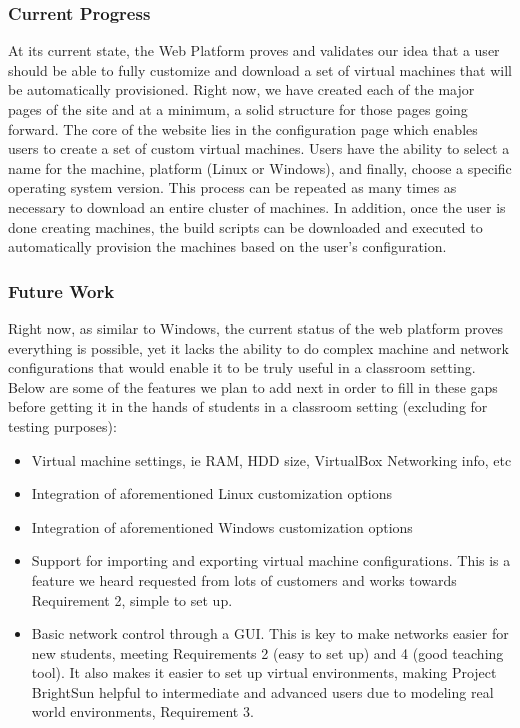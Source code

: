 \documentclass[openright]{report}
\begin{document}
\subsubsection{Current Progress}
At its current state, the Web Platform proves and validates our idea that a user should be able to fully customize and download a set of virtual machines that will be automatically provisioned. Right now, we have created each of the major pages of the site and at a minimum, a solid structure for those pages going forward. The core of the website lies in the configuration page which enables users to create a set of custom virtual machines. Users have the ability to select a name for the machine, platform (Linux or Windows), and finally, choose a specific operating system version. This process can be repeated as many times as necessary to download an entire cluster of machines. In addition, once the user is done creating machines, the build scripts can be downloaded and executed to automatically provision the machines based on the user's configuration.

\subsubsection{Future Work}
Right now, as similar to Windows, the current status of the web platform proves everything is possible, yet it lacks the ability to do complex machine and network configurations that would enable it to be truly useful in a classroom setting. Below are some of the features we plan to add next in order to fill in these gaps before getting it in the hands of students in a classroom setting (excluding for testing purposes):

\begin{itemize}
    \item Virtual machine settings, ie RAM, HDD size, VirtualBox Networking info, etc
    \item Integration of aforementioned Linux customization options
    \item Integration of aforementioned Windows customization options
    \item Support for importing and exporting virtual machine configurations. This is a feature we heard requested from lots of customers and works towards Requirement 2, simple to set up.
    \item Basic network control through a GUI. This is key to make networks easier for new students, meeting Requirements 2 (easy to set up) and 4 (good teaching tool). It also makes it easier to set up virtual environments, making Project BrightSun helpful to intermediate and advanced users due to modeling real world environments, Requirement 3.
\end{itemize}
\end{document}
